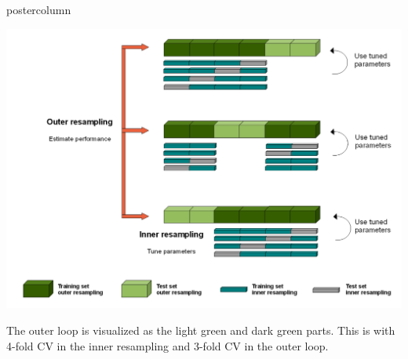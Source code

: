 \documentclass{beamer}
\begin{document}
\begin{frame}[fragile]{}
\begin{columns}
\begin{column}{.31\textwidth}
\begin{beamercolorbox}[center]{postercolumn}
\begin{minipage}{.98\textwidth}
{\begin{myblock}{}
 \begin{center}
             \includegraphics[width=0.9\columnwidth]{img/tuning_2.PNG}
               \end{center}
The outer loop is visualized as the light green and dark green parts. This is with 4-fold CV in the inner resampling and 3-fold CV in the outer loop.

                    \end{myblock}



}
\end{minipage}
\end{beamercolorbox}
\end{column}

\end{columns}
\end{frame}
\end{document}
